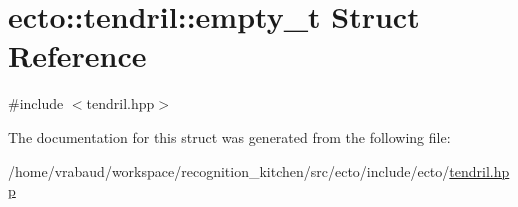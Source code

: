 \hypertarget{structecto_1_1tendril_1_1empty__t}{\section{ecto\-:\-:tendril\-:\-:empty\-\_\-t Struct Reference}
\label{structecto_1_1tendril_1_1empty__t}
}


{\ttfamily \#include $<$tendril.\-hpp$>$}



The documentation for this struct was generated from the following file\-:\begin{DoxyCompactItemize}
\item 
/home/vrabaud/workspace/recognition\-\_\-kitchen/src/ecto/include/ecto/\hyperlink{tendril_8hpp}{tendril.\-hpp}\end{DoxyCompactItemize}
